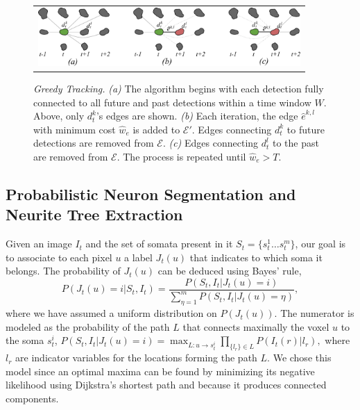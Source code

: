 \begin{figure}[t]
  \centering
       \begin{tabular}{c}
        \includegraphics[width = 100mm] {images/greedytracking.pdf}\\ [-2.4ex]
       \end{tabular} 
    \caption{  {\footnotesize {\it Greedy  Tracking.}  {\em  (a)} The algorithm begins with each
        detection fully connected to all future and past detections
        within  a time  window  $W$.  Above, only  $d^k_t$'s edges  are
        shown. {\em  (b)} Each iteration,  the edge $\hat{e}^{k,l}$
        with   minimum  cost   $\hat{w}_e$  is  added  to $\mathcal{E}'$.   Edges  connecting
        $d^k_t$ to  future detections are  removed from $\mathcal{E}$.
        {\em  (c)} Edges  connecting  $d^l_t$ to  the past  are
        removed from $\mathcal{E}$.  The process is repeated until $\hat w_e > T$. }}
    \label{fig:greedytracking}
  
\vspace{-7mm}
\end{figure}

\vspace{-10mm}
\subsection{Probabilistic Neuron Segmentation and Neurite Tree Extraction}
\label{sec:segmentation}
\vspace{-2mm}
Given an  image $I_t$  and the set  of somata  present in it  $S_t=\{s_t^1 \dots
s_t^m \}$,  our goal is  to associate  to each pixel  $u$ a label  $J_t(u)$ that
indicates to which soma it belongs.   The probability of $J_t(u)$ can be deduced
using Bayes' rule,
\begin{equation}
  \label{eq:bayes}
  P(J_t(u)=i|S_t,I_t) = \frac{P(S_t,I_t| J_t(u)=i)}{\sum_{\eta=1}^m P(S_t,I_t|J_t(u)=\eta)},
\end{equation}
\noindent  where we  have assumed  a uniform  distribution on  $P(J_t(u))$.  The
numerator  is modeled  as the  probability of the path $L$ that connects maximally 
the voxel $u$ to the soma $s_t^i$,
$  P(S_t,I_t| J_t(u)=i) = \max_{L:u\rightarrow  s_t^i}   \prod_{\{l_{r}\}
    \in L  } P(I_t(r)|l_{r}),$
where $l_{r}$ are indicator  variables for the locations forming the
path $L$. We chose this model  since an optimal maxima can be found
by minimizing its  negative likelihood using Dijkstra's shortest  path and because
it produces connected components.

